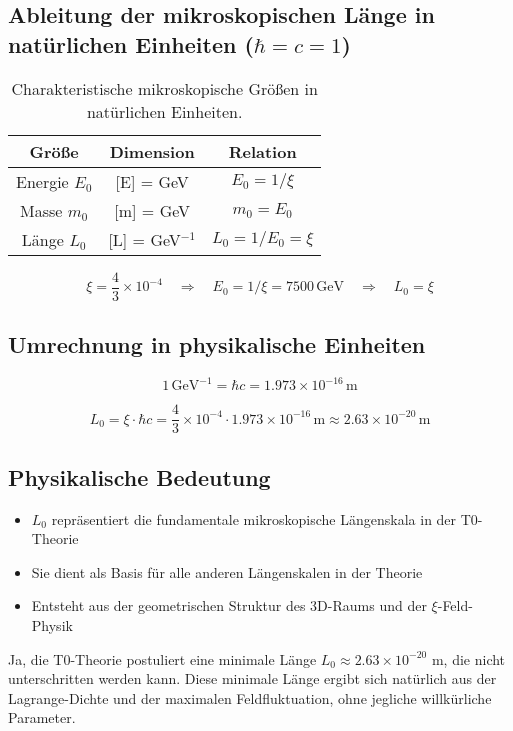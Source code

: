 \documentclass[12pt,a4paper]{article}
\numberwithin{equation}{section}
\begin{document}
	\subsection{Ableitung der mikroskopischen Länge in natürlichen Einheiten ($\hbar = c = 1$)}
	
	\begin{table}[h!]
		\centering
		\begin{tabular}{ccc}
			\toprule
			\textbf{Größe} & \textbf{Dimension} & \textbf{Relation} \\
			\midrule
			Energie $E_0$ & [E] = GeV & $E_0 = 1/\xi$ \\
			Masse $m_0$ & [m] = GeV & $m_0 = E_0$ \\
			Länge $L_0$ & [L] = GeV$^{-1}$ & $L_0 = 1/E_0 = \xi$ \\
			\bottomrule
		\end{tabular}
		\caption{Charakteristische mikroskopische Größen in natürlichen Einheiten.}
	\end{table}
	
	\[
	\xi = \frac{4}{3} \times 10^{-4} \quad \Rightarrow \quad E_0 = 1/\xi = 7500 \,\text{GeV} \quad \Rightarrow \quad L_0 = \xi
	\]
	
	\subsection{Umrechnung in physikalische Einheiten}
	
	\[
	1 \,\text{GeV}^{-1} = \hbar c = 1.973 \times 10^{-16}\,\text{m}
	\]
	
	\[
	L_0 = \xi \cdot \hbar c = \frac{4}{3} \times 10^{-4} \cdot 1.973 \times 10^{-16}\,\text{m} \approx 2.63 \times 10^{-20}\,\text{m}
	\]
	
	\subsection{Physikalische Bedeutung}
	
	\begin{itemize}
		\item $L_0$ repräsentiert die fundamentale mikroskopische Längenskala in der T0-Theorie
		\item Sie dient als Basis für alle anderen Längenskalen in der Theorie
		\item Entsteht aus der geometrischen Struktur des 3D-Raums und der $\xi$-Feld-Physik
	\end{itemize}
	
	\begin{important}
		Ja, die T0-Theorie postuliert eine minimale Länge $L_0 \approx 2.63 \times 10^{-20}$ m, die nicht unterschritten werden kann. Diese minimale Länge ergibt sich natürlich aus der Lagrange-Dichte und der maximalen Feldfluktuation, ohne jegliche willkürliche Parameter.
	\end{important}
	
\end{document}
